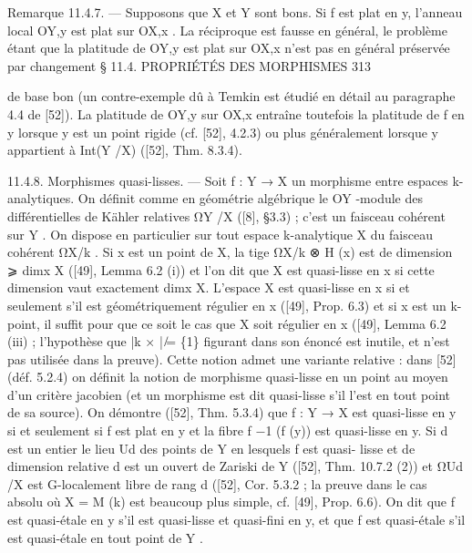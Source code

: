 \documentclass[
  10pt,
]{article}
\newenvironment{Shaded}{}{}
\newcommand{\NormalTok}[1]{#1}
\begin{document}
\begin{Shaded}
\begin{Highlighting}[]
\NormalTok{Remarque 11.4.7. — Supposons que X et Y sont bons. Si f est plat en y, l’anneau}
\NormalTok{local OY,y est plat sur OX,x . La réciproque est fausse en général, le problème étant que}
\NormalTok{la platitude de OY,y est plat sur OX,x n’est pas en général préservée par changement}
\NormalTok{                            § 11.4. PROPRIÉTÉS DES MORPHISMES                              313}

\NormalTok{de base bon (un contre{-}exemple dû à Temkin est étudié en détail au paragraphe 4.4 de}
\NormalTok{[52]).}
\NormalTok{   La platitude de OY,y sur OX,x entraîne toutefois la platitude de f en y lorsque y est}
\NormalTok{un point rigide (cf. [52], 4.2.3) ou plus généralement lorsque y appartient à Int(Y /X)}
\NormalTok{([52], Thm. 8.3.4).}

\NormalTok{11.4.8. Morphismes quasi{-}lisses. — Soit f : Y → X un morphisme entre espaces k{-}}
\NormalTok{analytiques. On définit comme en géométrie algébrique le OY {-}module des différentielles}
\NormalTok{de Kähler relatives ΩY /X ([8], §3.3) ; c’est un faisceau cohérent sur Y . On dispose en}
\NormalTok{particulier sur tout espace k{-}analytique X du faisceau cohérent ΩX/k . Si x est un point}
\NormalTok{de X, la tige ΩX/k ⊗ H (x) est de dimension ⩾ dimx X ([49], Lemma 6.2 (i)) et l’on dit}
\NormalTok{que X est quasi{-}lisse en x si cette dimension vaut exactement dimx X. L’espace X est}
\NormalTok{quasi{-}lisse en x si et seulement s’il est géométriquement régulier en x ([49], Prop. 6.3) et}
\NormalTok{si x est un k{-}point, il suffit pour que ce soit le cas que X soit régulier en x ([49], Lemma}
\NormalTok{6.2 (iii) ; l’hypothèse que |k × | ̸= \{1\} figurant dans son énoncé est inutile, et n’est pas}
\NormalTok{utilisée dans la preuve).}
\NormalTok{   Cette notion admet une variante relative : dans [52] (déf. 5.2.4) on définit la notion}
\NormalTok{de morphisme quasi{-}lisse en un point au moyen d’un critère jacobien (et un morphisme}
\NormalTok{est dit quasi{-}lisse s’il l’est en tout point de sa source). On démontre ([52], Thm. 5.3.4)}
\NormalTok{que f : Y → X est quasi{-}lisse en y si et seulement si f est plat en y et la fibre f −1 (f (y))}
\NormalTok{est quasi{-}lisse en y. Si d est un entier le lieu Ud des points de Y en lesquels f est quasi{-}}
\NormalTok{lisse et de dimension relative d est un ouvert de Zariski de Y ([52], Thm. 10.7.2 (2)) et}
\NormalTok{ΩUd /X est G{-}localement libre de rang d ([52], Cor. 5.3.2 ; la preuve dans le cas absolu où}
\NormalTok{X = M (k) est beaucoup plus simple, cf. [49], Prop. 6.6).}
\NormalTok{   On dit que f est quasi{-}étale en y s’il est quasi{-}lisse et quasi{-}fini en y, et que f est}
\NormalTok{quasi{-}étale s’il est quasi{-}étale en tout point de Y .}


\end{Highlighting}
\end{Shaded}
\end{document}
